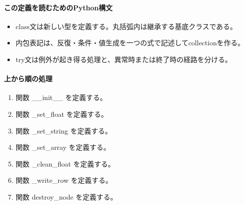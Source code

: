 \documentclass[a4paper,11pt]{article}
\begin{document}
            \paragraph{この定義を読むためのPython構文}
            \begin{itemize}[leftmargin=1.6em]
            \item class文は新しい型を定義する。丸括弧内は継承する基底クラスである。
\item 内包表記は、反復・条件・値生成を一つの式で記述してcollectionを作る。
\item try文は例外が起き得る処理と、異常時または終了時の経路を分ける。
            \end{itemize}
            \paragraph{上から順の処理}
            \begin{enumerate}[leftmargin=1.8em]
            \item 関数 \_\_init\_\_ を定義する。
\item 関数 \_set\_float を定義する。
\item 関数 \_set\_string を定義する。
\item 関数 \_set\_array を定義する。
\item 関数 \_clean\_float を定義する。
\item 関数 \_write\_row を定義する。
\item 関数 destroy\_node を定義する。
            \end{enumerate}
\end{document}
